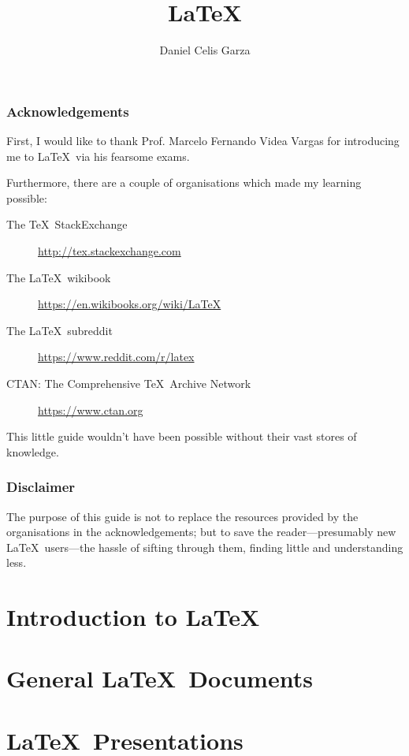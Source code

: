 \documentclass[12pt]{report}
\title{\LaTeX}[Quick-Start Guide]
\author{Daniel Celis Garza}
\begin{document}
\frontmatter
\maketitle

\section{Acknowledgements}
First, I would like to thank Prof. Marcelo Fernando Videa Vargas for
introducing me to \LaTeX~via his fearsome exams.

Furthermore, there are a couple of organisations which made my
learning possible:
\begin{description}
\item[The \TeX\ StackExchange]
  \url{http://tex.stackexchange.com}
\item[The \LaTeX\ wikibook]
  \url{https://en.wikibooks.org/wiki/LaTeX}
\item[The \LaTeX\ subreddit]
  \url{https://www.reddit.com/r/latex}
\item[CTAN: The Comprehensive \TeX\ Archive Network]
  \url{https://www.ctan.org}
\end{description}
This little guide wouldn't have been possible without their vast
stores of knowledge.

\section{Disclaimer}
The purpose of this guide is not to replace the resources provided by
the organisations in the acknowledgements; but to save the
reader---presumably new \LaTeX~users---the hassle of sifting through
them, finding little and understanding less.

\clearpage
\tableofcontents
\listoftables
\listoffigures

\mainmatter

\part{Introduction to \LaTeX}



\part{General \LaTeX~Documents}






\part{\LaTeX~Presentations}



\backmatter



\end{document}
